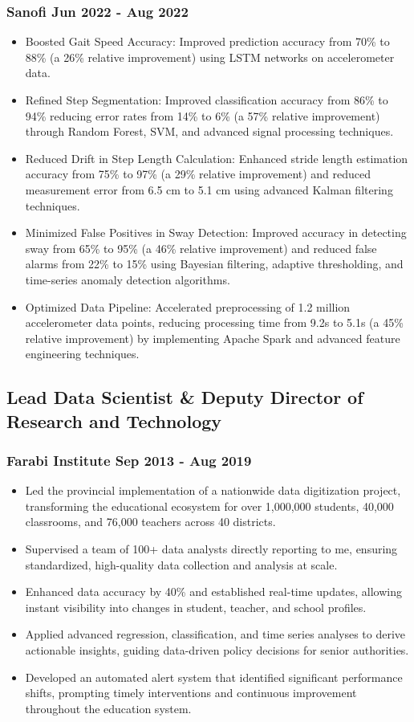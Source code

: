 \documentclass[11pt]{article} %
\begin{document}
\subsubsection{Sanofi \hfill Jun 2022 - Aug 2022}
\begin{itemize}
	\item Boosted Gait Speed Accuracy: Improved prediction accuracy from 70\% to 88\% (a 26\% relative improvement) using LSTM networks on accelerometer data.
	\item Refined Step Segmentation: Improved classification accuracy from 86\% to 94\% reducing error rates from 14\% to 6\% (a 57\% relative improvement) through Random Forest, SVM, and advanced signal processing techniques.
	\item Reduced Drift in Step Length Calculation: Enhanced stride length estimation accuracy from 75\% to 97\% (a 29\% relative improvement) and reduced measurement error from 6.5 cm to 5.1 cm using advanced Kalman filtering techniques.
	\item Minimized False Positives in Sway Detection: Improved accuracy in detecting sway from 65\% to 95\% (a 46\% relative improvement) and reduced false alarms from 22\% to 15\% using Bayesian filtering, adaptive thresholding, and time-series anomaly detection algorithms.
	\item Optimized Data Pipeline: Accelerated preprocessing of 1.2 million accelerometer data points, reducing processing time from 9.2s to 5.1s (a 45\% relative improvement) by implementing Apache Spark and advanced feature engineering techniques.
\end{itemize}

\subsection{Lead Data Scientist \& Deputy Director of Research and Technology}
\subsubsection{Farabi Institute \hfill Sep 2013 - Aug 2019}
\begin{itemize}
	\item Led the provincial implementation of a nationwide data digitization project, transforming the educational ecosystem for over 1,000,000 students, 40,000 classrooms, and 76,000 teachers across 40 districts.
	\item Supervised a team of 100+ data analysts directly reporting to me, ensuring standardized, high-quality data collection and analysis at scale. 
	\item Enhanced data accuracy by 40\% and established real-time updates, allowing instant visibility into changes in student, teacher, and school profiles.
	\item Applied advanced regression, classification, and time series analyses to derive actionable insights, guiding data-driven policy decisions for senior authorities.
	\item Developed an automated alert system that identified significant performance shifts, prompting timely interventions and continuous improvement throughout the education system.
\end{itemize}
\end{document}
